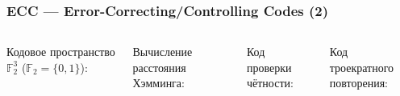 \begin{frame}[fragile]
\frametitle{ECC — Error-Correcting/Controlling Codes (2)}

\small
\begin{columns}
    \column{6.5cm}
    Кодовое пространство $\mathbb F_2^3$
        ($\mathbb F_2 = \{0,1\}$):


Вычисление расстояния Хэмминга:


    \column{5.9cm}
Код проверки чётности:

Код троекратного повторения:
\end{columns}

\end{frame}



